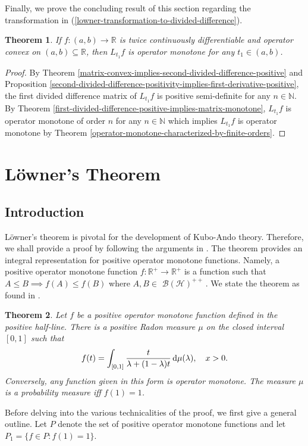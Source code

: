 \documentclass[12pt,a4paper]{amsart}
\newtheorem{theorem}{Theorem}
\theoremstyle{definition}
\newcommand{\mybhplusplus}{$\mathscr{B}(\mathscr{H})^{++}$}
\begin{document}
	Finally, we prove the concluding result of this section regarding the transformation in (\ref{lowner-transformation-to-divided-difference}).
	\begin{theorem}\label{concavity-implies-divided-difference-is-operator-monotone}
		If $f: (a, b) \rightarrow \mathbb{R}$ is twice continuously differentiable and operator convex on $(a, b) \subseteq \mathbb{R}$, then $L_{t_1}f$ is operator monotone for any $t_1 \in (a, b)$.
	\end{theorem}
	\begin{proof}
		By Theorem \ref{matrix-convex-implies-second-divided-difference-positive} and Proposition \ref{second-divided-difference-positivity-implies-first-derivative-positive}, the first divided difference matrix of $L_{t_1}f$ is positive semi-definite for any $n \in \mathbb{N}$. By Theorem \ref{first-divided-difference-positive-implies-matrix-monotone}, $L_{t_1}f$ is operator monotone of order $n$ for any $n \in \mathbb{N}$ which implies $L_{t_1}f$ is operator monotone by Theorem \ref{operator-monotone-characterized-by-finite-orders}.
	\end{proof}
	
		\section{L\"owner's Theorem}
	\subsection{Introduction}
	L\"owner's theorem is pivotal for the development of Kubo-Ando theory. Therefore, we shall provide a proof by following the arguments in \cite{hansen-fasttrack}. The theorem provides an integral representation for positive operator monotone functions. Namely, a positive operator monotone function $f: \mathbb{R}^{+} \rightarrow \mathbb{R}^{+}$ is a function such that $A \leq B \implies f(A) \leq f(B)$ where $A, B \in$ \mybhplusplus\,.
	We state the theorem as found in \cite[Theorem 4.9]{hansen-fasttrack}.
	\begin{theorem}\label{lowner-theorem-from-hansen}
		Let $f$ be a positive operator monotone function defined in the positive half-line. There is a  positive Radon measure $\mu$ on the closed interval $[0,1]$ such that 
		\begin{equation}\label{lowner-theory-weak}
			f(t) = \int_{[0,1]} \frac{t}{\lambda + (1-\lambda)t}  \,  {\rm d} \mu(\lambda), \quad x > 0.
		\end{equation}
		Conversely, any function given in this form is operator monotone. The measure $\mu$ is a probability measure iff $f(1) =1$.
	\end{theorem}
	Before delving into the various technicalities of the proof, we first give a general outline. Let $P$ denote the set of positive operator monotone functions and let $P_1 = \lbrace f \in P : f(1) =1 \rbrace$.
	
\end{document}
